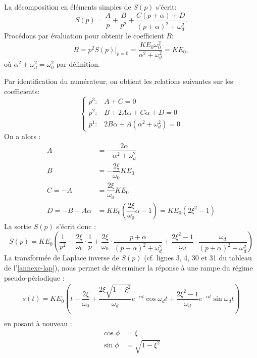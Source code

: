 La décomposition en éléments simples de $S(p)$ s'écrit:
\[
S(p)=\dfrac{A}{p}+\dfrac{B}{p^2}+\dfrac{C(p+\alpha)+D}{(p+\alpha)^2+\omega_d^2}.
\] 
Procédons par évaluation pour obtenir le coefficient $B$:
\[
B=p^2S(p)\Big|_{p=0}=\dfrac{KE_0\omega_0^2}{\alpha^2+\omega_d^2}=KE_0,
\]
où $\alpha^2+\omega_d^2=\omega_0^2$ par définition.

Par identification du numérateur,
on obtient les relations suivantes sur les coefficients:
\[
\begin{cases}
    p^3:\,\,\,\,\,A+C=0\\
    p^2:\,\,\,\,\,B+2A\alpha+C\alpha+D=0\\
    p^1:\,\,\,\,\,2B\alpha+A(\alpha^2+\omega_d^2)=0
\end{cases}
\]
On a alors :
\begin{align*}
    A&=-\dfrac{2\alpha}{\alpha^2+\omega_d^2}\\
    B&=-\dfrac{2\xi}{\omega_0}KE_0\\
    C=-A&=\dfrac{2\xi}{\omega_0}KE_0\\
    D=-B-A\alpha&=KE_0\left(\dfrac{2\xi}{\omega_0}\alpha-1\right)=KE_0(2\xi^2-1)
\end{align*}
La sortie $S(p)$ s'écrit donc :
\[
S(p)=KE_0\left(\dfrac{1}{p^2}-\dfrac{2\xi}{\omega_0}\cdot
               \dfrac{1}{p}+\dfrac{2\xi}{\omega_0}\cdot
			   \dfrac{p+\alpha}{(p+\alpha)^2+\omega_d^2}+
			   \dfrac{2\xi^2-1}{\omega_d}\cdot\dfrac{\omega_d}
			   {(p+\alpha)^2+\omega_d^2}\right)
\]
La transformée de Laplace inverse de $S(p)$ (cf. lignes 3, 4, 30 
et 31 du tableau de l'\cref{annexe-lap}), nous permet de déterminer la 
réponse à une rampe du régime pseudo-périodique :
\begin{align*}
    s(t)=KE_0\left(t-\dfrac{2\xi}{\omega_0}+
    \dfrac{2\xi\sqrt{1-\xi^2}}{\omega_d}
    e^{-\alpha t}\cos{\omega_d t}+
    \dfrac{2\xi^2-1}{\omega_d}e^{-\alpha t}\sin{\omega_d t}
    \right)\\
\end{align*}
en posant à nouveau : 
\begin{align*}
    \cos{\phi}&=\xi\\
    \sin{\phi}&=\sqrt{1-\xi^2}
\end{align*}
